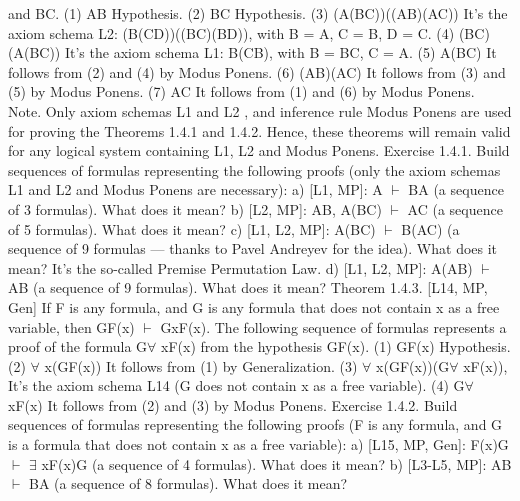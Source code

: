 and B\IMPLIES C.
(1) A\IMPLIES B
Hypothesis.
(2) B\IMPLIES C Hypothesis.
(3) (A\IMPLIES (B\IMPLIES C))\IMPLIES ((A\IMPLIES B)\IMPLIES (A\IMPLIES C)) It's the axiom schema L2:
                                       (B\IMPLIES (C\IMPLIES D))\IMPLIES ((B\IMPLIES C)\IMPLIES (B\IMPLIES D)), with B =
                                                  A, C = B, D = C.
(4) (B\IMPLIES C)\IMPLIES (A\IMPLIES (B\IMPLIES C)) It's the axiom schema L1: B\IMPLIES (C\IMPLIES B), with B
                               = B\IMPLIES C, C = A.
(5) A\IMPLIES (B\IMPLIES C) It follows from (2) and (4) by Modus Ponens.
(6) (A\IMPLIES B)\IMPLIES (A\IMPLIES C) It follows from (3) and (5) by Modus Ponens.
(7) A\IMPLIES C It follows from (1) and (6) by Modus Ponens.
Note. Only axiom schemas L1 and L2 , and inference rule Modus Ponens are used for proving the
Theorems 1.4.1 and 1.4.2. Hence, these theorems will remain valid for any logical system containing
L1, L2 and Modus Ponens.
Exercise 1.4.1. Build sequences of formulas representing the following proofs (only the axiom schemas
L1 and L2 and Modus Ponens are necessary):
a) [L1, MP]: A \(\vdash\) B\IMPLIES A (a sequence of 3 formulas). What does it mean?
b) [L2, MP]: A\IMPLIES B, A\IMPLIES (B\IMPLIES C) \(\vdash\) A\IMPLIES C (a sequence of 5 formulas). What does it mean?
c) [L1, L2, MP]: A\IMPLIES (B\IMPLIES C) \(\vdash\) B\IMPLIES (A\IMPLIES C) (a sequence of 9 formulas --- thanks to Pavel Andreyev for the
idea). What does it mean? It's the so-called Premise Permutation Law.
d) [L1, L2, MP]: A\IMPLIES (A\IMPLIES B) \(\vdash\) A\IMPLIES B (a sequence of 9 formulas). What does it mean?
Theorem 1.4.3. [L14, MP, Gen] If F is any formula, and G is any formula that does not contain x as a free
variable, then
G\IMPLIES F(x) \(\vdash\) G\IMPLIES \forall xF(x).
The following sequence of formulas represents a proof of the formula G\IMPLIES \(\forall\) xF(x) from the hypothesis
G\IMPLIES F(x).
(1) G\IMPLIES F(x) Hypothesis.
(2) \(\forall\) x(G\IMPLIES F(x)) It follows from (1) by Generalization.
(3) \(\forall\) x(G\IMPLIES F(x))\IMPLIES (G\IMPLIES \(\forall\) xF(x)), It's the axiom schema L14 (G does not contain x as a free variable).
(4) G\IMPLIES \(\forall\) xF(x) It follows from (2) and (3) by Modus Ponens.
Exercise 1.4.2. Build sequences of formulas representing the following proofs (F is any formula, and G is
a formula that does not contain x as a free variable):
a) [L15, MP, Gen]: F(x)\IMPLIES G \(\vdash\) \(\exists\) xF(x)\IMPLIES G (a sequence of 4 formulas). What does it mean?
b) [L3-L5, MP]: A\AND B \(\vdash\) B\AND A (a sequence of 8 formulas). What does it mean?

